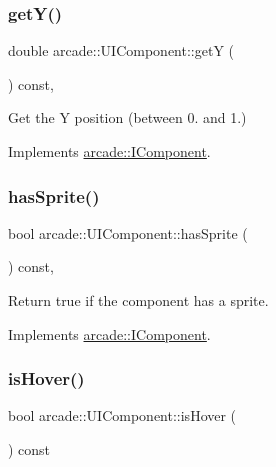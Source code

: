 \subsubsection{\texorpdfstring{get\+Y()}{getY()}}
{\footnotesize\ttfamily double arcade\+::\+U\+I\+Component\+::getY (\begin{DoxyParamCaption}{ }\end{DoxyParamCaption}) const\hspace{0.3cm}{\ttfamily [override]}, {\ttfamily [virtual]}}



Get the Y position (between 0. and 1.) 



Implements \hyperlink{classarcade_1_1_i_component_ad19f185c30ab99ed831d2c68fabf920f}{arcade\+::\+I\+Component}.

\mbox{\label{classarcade_1_1_u_i_component_a0f41ff1be1ae457a3be0856553e904f4}} 
\subsubsection{\texorpdfstring{has\+Sprite()}{hasSprite()}}
{\footnotesize\ttfamily bool arcade\+::\+U\+I\+Component\+::has\+Sprite (\begin{DoxyParamCaption}{ }\end{DoxyParamCaption}) const\hspace{0.3cm}{\ttfamily [override]}, {\ttfamily [virtual]}}



Return true if the component has a sprite. 



Implements \hyperlink{classarcade_1_1_i_component_a03ea8019a23fd44731a06548ef7e6ff3}{arcade\+::\+I\+Component}.

\mbox{\label{classarcade_1_1_u_i_component_a3ee6eaf72f0622ac5e49c285b48d73a6}} 
\subsubsection{\texorpdfstring{is\+Hover()}{isHover()}}
{\footnotesize\ttfamily bool arcade\+::\+U\+I\+Component\+::is\+Hover (\begin{DoxyParamCaption}{ }\end{DoxyParamCaption}) const}

